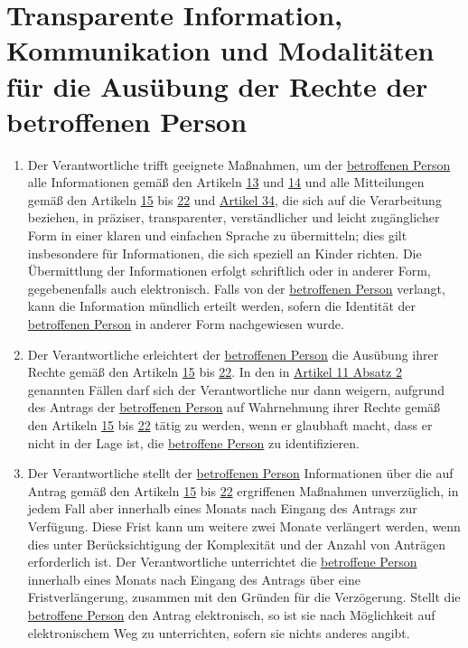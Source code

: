 \chapter{Transparente Information, Kommunikation und Modalitäten für die Ausübung der Rechte der betroffenen Person}
\label{ch:12}


\begin{enumerate}

  \item Der Verantwortliche trifft geeignete Maßnahmen, um der \hyperref[itm:04-1]{betroffenen Person} alle Informationen gemäß den Artikeln
   \hyperref[ch:13]{13} und \hyperref[ch:14]{14} und alle Mitteilungen gemäß den Artikeln \hyperref[ch:15]{15} bis
   \hyperref[ch:22]{22} und \hyperref[ch:34]{Artikel 34}, die sich auf die Verarbeitung beziehen, in präziser,
    transparenter, verständlicher und leicht zugänglicher Form in einer klaren und einfachen Sprache zu übermitteln;
    dies gilt insbesondere für Informationen, die sich speziell an Kinder richten. Die Übermittlung der Informationen
    erfolgt schriftlich oder in anderer Form, gegebenenfalls auch elektronisch. Falls von der \hyperref[itm:04-1]{betroffenen Person}
    verlangt, kann die Information mündlich erteilt werden, sofern die Identität der \hyperref[itm:04-1]{betroffenen Person} in anderer Form
    nachgewiesen wurde.
  \label{itm:12-1}

  \item Der Verantwortliche erleichtert der \hyperref[itm:04-1]{betroffenen Person} die Ausübung ihrer Rechte gemäß den Artikeln \hyperref
   [ch:15]{15} bis \hyperref[ch:22]{22}. In den in \hyperref[itm:11-2]{Artikel 11 Absatz 2} genannten Fällen darf sich
   der Verantwortliche nur dann weigern, aufgrund des Antrags der \hyperref[itm:04-1]{betroffenen Person} auf Wahrnehmung ihrer Rechte gemäß
   den Artikeln \hyperref[ch:15]{15} bis \hyperref[ch:22]{22} tätig zu werden, wenn er glaubhaft macht, dass er nicht
   in der Lage ist, die \hyperref[itm:04-1]{betroffene Person} zu identifizieren.
  \label{itm:12-2}

  \item Der Verantwortliche stellt der \hyperref[itm:04-1]{betroffenen Person} Informationen über die auf Antrag gemäß den Artikeln \hyperref
   [ch:15]{15} bis \hyperref[ch:22]{22} ergriffenen Maßnahmen unverzüglich, in jedem Fall aber innerhalb eines Monats
   nach Eingang des Antrags zur Verfügung. Diese Frist kann um weitere zwei Monate verlängert werden, wenn dies unter
   Berücksichtigung der Komplexität und der Anzahl von Anträgen erforderlich ist. Der Verantwortliche unterrichtet die
   \hyperref[itm:04-1]{betroffene Person} innerhalb eines Monats nach Eingang des Antrags über eine Fristverlängerung, zusammen mit den
   Gründen für die Verzögerung. Stellt die \hyperref[itm:04-1]{betroffene Person} den Antrag elektronisch, so ist sie nach Möglichkeit auf
   elektronischem Weg zu unterrichten, sofern sie nichts anderes angibt.
  \label{itm:12-3}


\end{enumerate}
